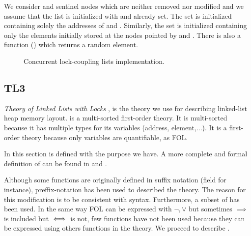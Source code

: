 We consider \head and \tail sentinel nodes which are neither removed nor 
modified and we assume that the list is initialized with \head and \tail 
already set.
%
The set \region is initialized containing solely the addresses of \head 
and \tail.
%
Similarly, the set \elements is initialized containing only the elements 
initially stored at the nodes pointed by \head and \tail.
%
There is also a function () which returns a random element. 
%
%
%
\begin{figure}[!htbp]
		\caption{Concurrent lock-coupling lists implementation.}
		\label{fig:listcode}
\end{figure}
%


\subsection{TL3}
%
\emph{Theory of Linked Lists with Locks} \TLLpL, is the theory we use for describing linked-list heap memory layout.
%
\TLLpL is a multi-sorted first-order theory.
%
It is multi-sorted because it has multiple types for its variables (address, element,...).
%
It is a first-order theory because only variables are quantifiable, as \gls{FOL}.

In this section \TLLpL is defined with the purpose we have. 
%
A more complete and formal definition of \TLLpL can be found in  and \citep[6.2]{thesisAle}.

Although some functions are originally defined \citep{thesisAle} in suffix notation (\fNext field for instance), preffix-notation has been used to described the theory. 
%
The reason for this modification is to be consistent with \spass syntax.
%
Furthermore, a subset of \TLLpL has been used. 
%
In the same way \gls{FOL} can be expressed with $\neg,\vee$ but sometimes $\implies$ is included but $\iff$ is not,
%
few functions have not been used because they can be expressed using others functions in the theory. 
%
We proceed to describe \TLLpL.



